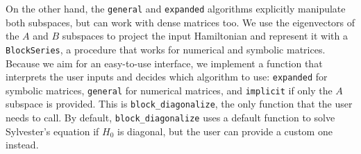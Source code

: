 On the other hand, the \texttt{general} and \texttt{expanded} algorithms explicitly
manipulate both subspaces, but can work with dense matrices too.
We use the eigenvectors of the $A$ and $B$ subspaces to project the input
Hamiltonian and represent it with a \texttt{BlockSeries}, a procedure that works for
numerical and symbolic matrices.
Because we aim for an easy-to-use interface, we implement a function that
interprets the user inputs and decides which algorithm to use: \texttt{expanded}
for symbolic matrices, \texttt{general} for numerical matrices, and \texttt{implicit} if
only the $A$ subspace is provided.
This is \texttt{block\_diagonalize}, the only function that the user needs to call.
By default, \texttt{block\_diagonalize} uses a default function to solve Sylvester's
equation if $H_0$ is diagonal, but the user can provide a custom one instead.
